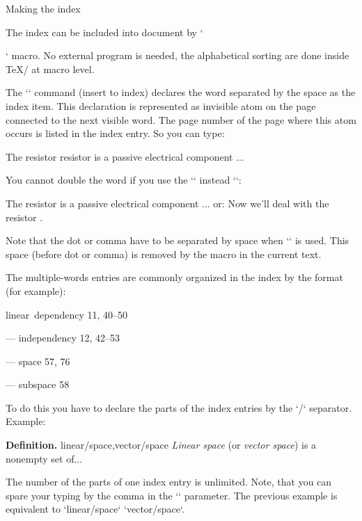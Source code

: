 {\begtt
\def\mylogo{\leavevmode\hbox{\Red{\it My}\Black{\setfontsize{mag1.5}\rm Lo}Go}}
\regmacro {\def\mylogo{\hbox{\Red My\Black LoGo}}} %
          {\def\mylogo{\hbox{{\it My}\/LoGo}}}     %
          {\def\mylogo{MyLoGo}}                    %
\endtt

\secc Making the index 

The index can be included into document by `\makeindex` macro. No external
program is needed, the alphabetical sorting are done inside \TeX/ at macro
level.

The `\ii` command (insert to index) declares the word separated by the space
as the index item. This declaration is represented as invisible atom on the
page connected to the next visible word. The page number of the page where
this atom occurs is listed in the index entry. So you can type:

\begtt
The \ii resistor resistor is a passive electrical component ...
\endtt

You cannot double the word if you use the `\iid` instead `\ii`:

\begtt
The \iid resistor is a passive electrical component ...
or:
Now we'll deal with the \iid resistor .
\endtt

Note that the dot or comma have to be separated by space when `\iid` is
used. This space (before dot or comma) is removed by the macro in 
the current text.

The multiple-words entries are commonly organized in the index by the format
(for example): 

\medskip

linear~dependency  11, 40--50

--- independency 12, 42--53

--- space 57, 76

--- subspace 58

\medskip

To do this you have to declare the parts of the index entries by the `/` separator.
Example:

\begtt
{\bf Definition.}
\ii linear/space,vector/space
{\em Linear space} (or {\em vector space}) is a nonempty set of...
\endtt

The number of the parts of one index entry is unlimited. Note, that you can
spare your typing by the comma in the `\ii` parameter. The previous example
is equivalent to `\ii linear/space` `\ii vector/space`.

}
